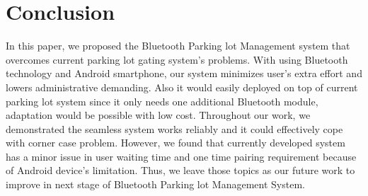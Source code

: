\section{Conclusion}

In this paper, we proposed the Bluetooth Parking lot Management system that overcomes current parking lot gating system's problems. With using Bluetooth technology and Android smartphone, our system minimizes user's extra effort and lowers administrative demanding.  Also it would easily deployed on top of current parking lot system since it only needs one additional Bluetooth module, adaptation would be possible with low cost. Throughout our work, we demonstrated the seamless system works reliably and it could effectively cope with corner case problem. However, we found that currently developed system has a minor issue in user waiting time and one time pairing requirement because of Android device's limitation. Thus, we leave those topics as our future work to improve in next stage of Bluetooth Parking lot Management System.